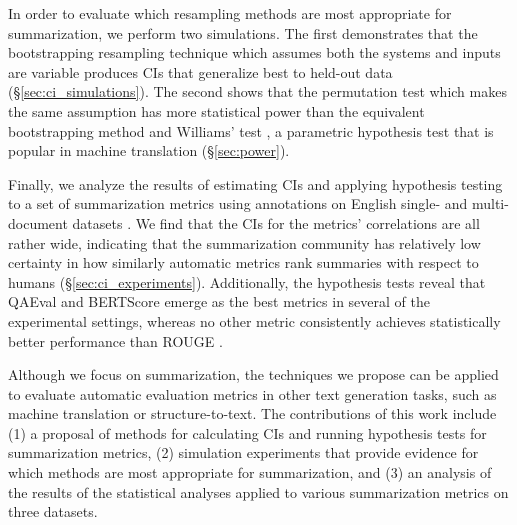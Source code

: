 In order to evaluate which resampling methods are most appropriate for summarization, we perform two simulations.
The first demonstrates that the bootstrapping resampling technique which assumes both the systems and inputs are variable produces CIs that generalize best to held-out data (\S\ref{sec:ci_simulations}).
The second shows that the permutation test which makes the same assumption has more statistical power than the equivalent bootstrapping method and Williams' test \citep{Williams59}, a parametric hypothesis test that is popular in machine translation (\S\ref{sec:power}).

Finally, we analyze the results of estimating CIs and applying hypothesis testing to a set of summarization metrics using annotations on English single- and multi-document datasets \citep{DangOw08,FKMSR21,BGALN20}.
We find that the CIs for the metrics' correlations are all rather wide, indicating that the summarization community has relatively low certainty in how similarly automatic metrics rank summaries with respect to humans (\S\ref{sec:ci_experiments}).
Additionally, the hypothesis tests reveal that QA\-Eval \citep{DeutschBeRo20} and BERTScore \citep{ZKWWA20} emerge as the best metrics in several of the experimental settings, whereas no other metric consistently achieves statistically better performance than ROUGE \citep[\S\ref{sec:hypo_experiments};][]{Lin04}.

Although we focus on summarization, the techniques we propose can be applied to evaluate automatic evaluation metrics in other text generation tasks, such as machine translation or structure-to-text.
The contributions of this work include
(1) a proposal of methods for calculating CIs and running hypothesis tests for summarization metrics,
(2) simulation experiments that provide evidence for which methods are most appropriate for summarization,
and (3) an analysis of the results of the statistical analyses applied to various summarization metrics on three datasets.